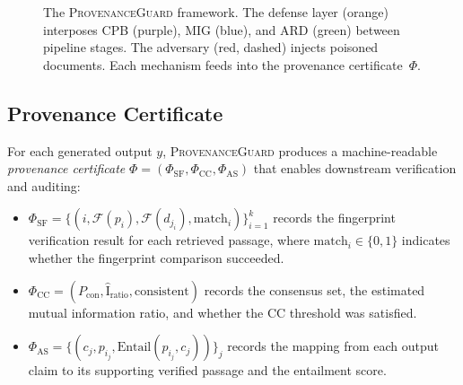 \documentclass[journal,10pt]{IEEEtran}
\newcommand{\MI}{\mathrm{I}}
\newcommand{\calF}{\mathcal{F}}
\begin{document}
\begin{figure}[t]
\caption{The \textsc{ProvenanceGuard} framework. The defense layer (orange) interposes CPB (purple), MIG (blue), and ARD (green) between pipeline stages. The adversary (red, dashed) injects poisoned documents. Each mechanism feeds into the provenance certificate~$\Phi$.}
\label{fig:framework}
\end{figure}

\subsection{Provenance Certificate}
For each generated output $y$, \textsc{ProvenanceGuard} produces a machine-readable \emph{provenance certificate} $\Phi = (\Phi_{\text{SF}}, \Phi_{\text{CC}}, \Phi_{\text{AS}})$ that enables downstream verification and auditing:
\begin{itemize}[leftmargin=*]
\item $\Phi_{\text{SF}} = \{(i, \calF(p_i), \calF(d_{j_i}), \text{match}_i)\}_{i=1}^k$ records the fingerprint verification result for each retrieved passage, where $\text{match}_i \in \{0, 1\}$ indicates whether the fingerprint comparison succeeded.
\item $\Phi_{\text{CC}} = (P_{\text{con}}, \hat{\MI}_{\text{ratio}}, \text{consistent})$ records the consensus set, the estimated mutual information ratio, and whether the CC threshold was satisfied.
\item $\Phi_{\text{AS}} = \{(c_j, p_{i_j}, \text{Entail}(p_{i_j}, c_j))\}_j$ records the mapping from each output claim to its supporting verified passage and the entailment score.
\end{itemize}
\end{document}
